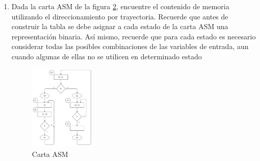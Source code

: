 \documentclass[table]{scrartcl}
\begin{document}
\begin{enumerate}
  \item Dada la carta ASM de la figura \hyperref[fig:2]{2}, encuentre el contenido de memoria
        utilizando el direccionamiento por trayectoria. Recuerde que antes de
        construir la tabla se debe asignar a cada estado de la carta ASM una
        representación binaria. Así mismo, recuerde que para cada estado es necesario
        considerar todas las posibles combinaciones de las variables de entrada, aun
        cuando algunas de ellas no se utilicen en determinado estado
        \begin{figure}[htbp]
          \centering
          \includegraphics[width=0.3\textwidth]{./img/2.png}
          \caption{\label{fig:2}Carta ASM}
        \end{figure}


\end{enumerate}
\end{document}
